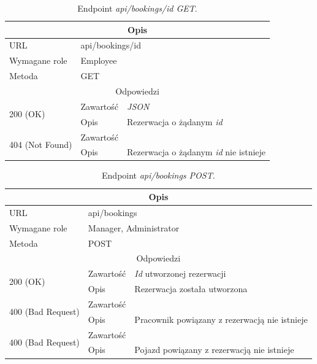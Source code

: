 \documentclass[eng,printmode,openany]{mgr}
\begin{document}
	\begin{table}[H]
		\caption{Endpoint \textit{api/bookings/id GET}.}
		\begin{tabularx}{\textwidth}{|l|l|X|}
			\hline
			\multicolumn{3}{|c|}{Opis}
			\\ \hline
			URL                         & \multicolumn{2}{l|}{api/bookings/id}
			\\ \hline
			Wymagane role               & \multicolumn{2}{l|}{Employee}
			\\ \hline
			Metoda                      & \multicolumn{2}{l|}{GET}
			\\ \hline
			\multicolumn{3}{|c|}{Odpowiedzi}
			\\ \hline
			\multirow{2}{*}{200 (OK)} 	        & Zawartość   	& \textit{JSON}
			\\ \cline{2-3}                      & Opis         	& Rezerwacja o żądanym \textit{id}
			\\ \hline
			\multirow{2}{*}{404 (Not Found)} 	& Zawartość     & 
			\\ \cline{2-3}                      & Opis          & Rezerwacja o żądanym \textit{id} nie istnieje
			\\ \hline
		\end{tabularx}
	\end{table}
	
	\begin{table}[H]
		\caption{Endpoint \textit{api/bookings POST}.}
		\begin{tabularx}{\textwidth}{|l|l|X|}
			\hline
			\multicolumn{3}{|c|}{Opis}
			\\ \hline
			URL                       & \multicolumn{2}{l|}{api/bookings}
			\\ \hline
			Wymagane role             & \multicolumn{2}{l|}{Manager, Administrator}
			\\ \hline
			Metoda                    & \multicolumn{2}{l|}{POST}
			\\ \hline
			\multicolumn{3}{|c|}{Odpowiedzi}
			\\ \hline
			\multirow{2}{*}{200 (OK)} 		& Zawartość     & \textit{Id} utworzonej rezerwacji
			\\ \cline{2-3}                  & Opis         	& Rezerwacja została utworzona
			\\ \hline
			\multirow{2}{*}{400 (Bad Request)} 	& Zawartość     &    
			\\ \cline{2-3}                      & Opis          & Pracownik powiązany z rezerwacją nie istnieje      						    
			\\ \hline
			\multirow{2}{*}{400 (Bad Request)} 	& Zawartość     &    
			\\ \cline{2-3}                      & Opis          & Pojazd powiązany z rezerwacją nie istnieje      								
			\\ \hline      
		\end{tabularx}
	\end{table}
	
\end{document}

